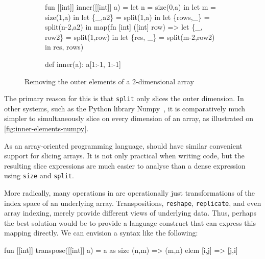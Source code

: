\begin{figure}
\centering
\begin{subfigure}[t]{.5\textwidth}
\begin{colorcode}
fun [[int]] inner([[int]] a) =
  let n = size(0,a) in
  let m = size(1,a) in
  let \{_,a2\}   = split(1,a) in
  let \{rows,_\} = split(n-2,a2) in
  map(fn [int] ([int] row) =>
        let \{_, row2\} =
          split(1,row) in
        let \{res, _\}  =
          split(m-2,row2) in
        res,
      rows)
\end{colorcode}
\subcaption{\LO{} \label{fig:inner-elements-l0}}
\end{subfigure}\hfill
\begin{subfigure}[t]{.4\textwidth}
\begin{colorcode}
def inner(a):
  a[1:-1, 1:-1]










\end{colorcode}
\end{subfigure}
\caption{Removing the outer elements of a $2$-dimensional array}
\label{fig:inner-elements}
\end{figure}

The primary reason for this is that \texttt{split} only slices the
outer dimension.  In other systems, such as the Python library
Numpy~\cite{oliphant2006guide}, it is comparatively much simpler to
simultaneously slice on every dimension of an array, as illustrated on
\cref{fig:inner-elements-numpy}.

As an array-oriented programming language, \LO{} should have similar
convenient support for slicing arrays.  It is not only practical when
writing code, but the resulting slice expressions are much easier to
analyse than a dense expression using \texttt{size} and
\texttt{split}.

More radically, many operations in \LO{} are operationally just
transformations of the index space of an underlying array.
Transpositions, \texttt{reshape}, \texttt{replicate}, and even array
indexing, merely provide different views of underlying data.  Thus,
perhaps the best solution would be to provide a language construct
that can express this mapping directly.  We can envision a syntax like
the following:

\begin{colorcode}
fun [[int]] transpose([[int]] a) =
   a as
    size (n,m) => (m,n) 
    elem [i,j] => [j,i] 
\end{colorcode}

